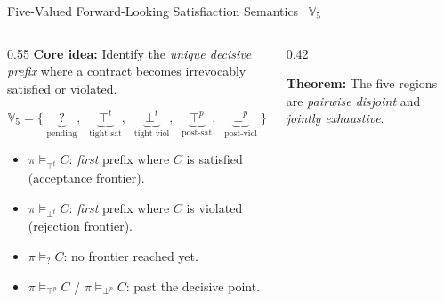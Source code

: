 \documentclass[9pt,aspectratio=169]{beamer}
\newcommand{\topt}{\top^t}
\newcommand{\bott}{\bot^t}
\newcommand{\topp}{\top^p}
\newcommand{\botp}{\bot^p}
\newcommand{\satt}{\models_{\topt}}
\newcommand{\violt}{\models_{\bott}}
\newcommand{\presat}{\models_{?}}
\newcommand{\postsat}{\models_{\topp}}
\newcommand{\postviol}{\models_{\botp}}
\newcommand{\tightverdicts}{\ensuremath{\mathbb{V}_5}\xspace}
\begin{document}
\begin{frame}{Five-Valued Forward-Looking Satisfiaction Semantics \textemdash\ $\tightverdicts$}
\small
\begin{columns}[T]
\begin{column}{0.55\textwidth}
  \textbf{Core idea:} Identify the \emph{unique decisive prefix} where a contract becomes irrevocably satisfied or violated.

  \[
  \tightverdicts = \{\;\underbrace{?}_{\text{pending}},\;\;
    \underbrace{\topt}_{\text{tight sat}},\;\;
    \underbrace{\bott}_{\text{tight viol}},\;\;
    \underbrace{\topp}_{\text{post-sat}},\;\;
    \underbrace{\botp}_{\text{post-viol}}\;\}
  \]

  \begin{itemize}
    \item $\pi \satt C$: \emph{first} prefix where $C$ is satisfied (acceptance frontier).
    \item $\pi \violt C$: \emph{first} prefix where $C$ is violated (rejection frontier).
    \item $\pi \presat C$: no frontier reached yet.
    \item $\pi \postsat C$ / $\pi \postviol C$: past the decisive point.
  \end{itemize}
\end{column}
\begin{column}{0.42\textwidth}
  \centering

  \vspace{2mm}
  \textbf{Theorem:} The five regions are \emph{pairwise disjoint} and \emph{jointly exhaustive}.
\end{column}
\end{columns}
\end{frame}
\end{document}
